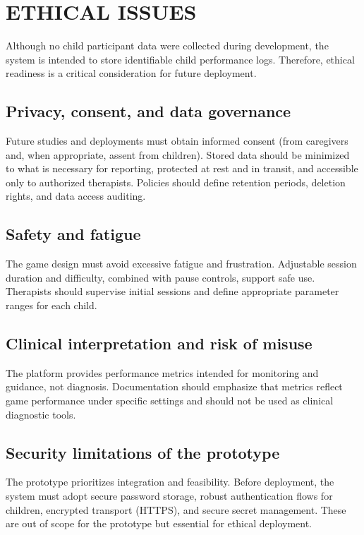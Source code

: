 \documentclass[12pt]{article}
\begin{document}
\clearpage
\section{ETHICAL ISSUES}
Although no child participant data were collected during development, the system is intended to store identifiable child performance logs. Therefore, ethical readiness is a critical consideration for future deployment.

\subsection*{Privacy, consent, and data governance}
Future studies and deployments must obtain informed consent (from caregivers and, when appropriate, assent from children). Stored data should be minimized to what is necessary for reporting, protected at rest and in transit, and accessible only to authorized therapists. Policies should define retention periods, deletion rights, and data access auditing.

\subsection*{Safety and fatigue}
The game design must avoid excessive fatigue and frustration. Adjustable session duration and difficulty, combined with pause controls, support safe use. Therapists should supervise initial sessions and define appropriate parameter ranges for each child.

\subsection*{Clinical interpretation and risk of misuse}
The platform provides performance metrics intended for monitoring and guidance, not diagnosis. Documentation should emphasize that metrics reflect game performance under specific settings and should not be used as clinical diagnostic tools.

\subsection*{Security limitations of the prototype}
The prototype prioritizes integration and feasibility. Before deployment, the system must adopt secure password storage, robust authentication flows for children, encrypted transport (HTTPS), and secure secret management. These are out of scope for the prototype but essential for ethical deployment.
\end{document}
